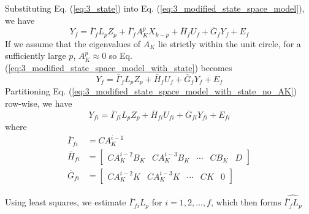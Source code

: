 Substituting Eq. (\ref{eq:3_state}) into Eq. (\ref{eq:3_modified_state_space_model}), we have
\begin{equation}\label{eq:3_modified_state_space_model_with_state}
Y_f = \overline{\Gamma}_f L_p Z_p + \overline{\Gamma}_f A_K^p X_{k-p} + \overline{H}_f U_f + \overline{G}_f Y_f + E_f
\end{equation}
If we assume that the eigenvalues of $A_K$ lie strictly within the unit circle, for a sufficiently large $p$, $A_K^p \approx 0$ so Eq. (\ref{eq:3_modified_state_space_model_with_state}) becomes
\begin{equation}\label{eq:3_modified_state_space_model_with_state_no_AK}
Y_f = \overline{\Gamma}_f L_p Z_p + \overline{H}_f U_f + \overline{G}_f Y_f + E_f
\end{equation}
Partitioning Eq. (\ref{eq:3_modified_state_space_model_with_state_no_AK}) row-wise, we have
\begin{equation}\label{eq:3_partitioned_modified_state_space_model}
Y_{fi} = \overline{\Gamma}_{fi} L_p Z_p + \overline{H}_{fi} U_{fi} + \overline{G}_{fi} Y_{fi} + E_{fi}
\end{equation}
where
\begin{align*}
\overline{\Gamma}_{fi} &= CA_K^{i-1}\\
\overline{H}_{fi} &= \begin{bmatrix} CA_K^{i-2}B_K & CA_K^{i-3}B_K & \cdots & CB_K & D\end{bmatrix}\\
\overline{G}_{fi} &= \begin{bmatrix} CA_K^{i-2}K & CA_K^{i-3}K & \cdots & CK & 0\end{bmatrix}
\end{align*}

Using least squares, we estimate $\overline{\Gamma}_{fi}L_p$ for $i = 1, 2, \dots, f$, which then forms $\widehat{\overline{\Gamma}_f L_p}$































